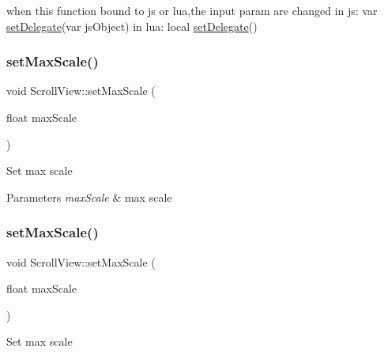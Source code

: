 \begin{DoxyCode}
when \textcolor{keyword}{this} \textcolor{keyword}{function} bound to js or lua,the input param are changed
in js: var \hyperlink{classScrollView_a450371726a685f72266384598630439c}{setDelegate}(var jsObject)
in lua: local \hyperlink{classScrollView_a450371726a685f72266384598630439c}{setDelegate}()
\end{DoxyCode}
 \mbox{\label{classScrollView_a8ec505c49d181c320f88cadbd2be5785}} 
\subsubsection{\texorpdfstring{set\+Max\+Scale()}{setMaxScale()}\hspace{0.1cm}{\footnotesize\ttfamily [1/2]}}
{\footnotesize\ttfamily void Scroll\+View\+::set\+Max\+Scale (\begin{DoxyParamCaption}\item[{float}]{max\+Scale }\end{DoxyParamCaption})\hspace{0.3cm}{\ttfamily [inline]}}

Set max scale


\begin{DoxyParams}{Parameters}
{\em max\+Scale} & max scale \\
\hline
\end{DoxyParams}
\mbox{\label{classScrollView_a8ec505c49d181c320f88cadbd2be5785}} 
\subsubsection{\texorpdfstring{set\+Max\+Scale()}{setMaxScale()}\hspace{0.1cm}{\footnotesize\ttfamily [2/2]}}
{\footnotesize\ttfamily void Scroll\+View\+::set\+Max\+Scale (\begin{DoxyParamCaption}\item[{float}]{max\+Scale }\end{DoxyParamCaption})\hspace{0.3cm}{\ttfamily [inline]}}

Set max scale


